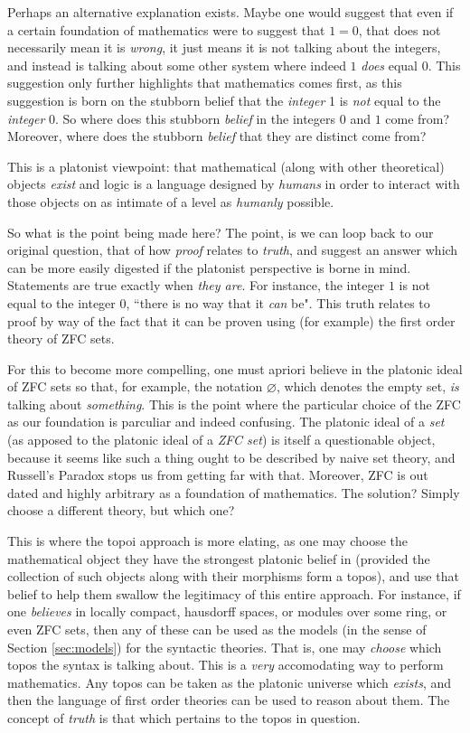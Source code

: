 \documentclass[12pt]{article}
\theoremstyle{plain}
\theoremstyle{definition}
\begin{document}
	Perhaps an alternative explanation exists. Maybe one would suggest that even if a certain foundation of mathematics were to suggest that $1 = 0$, that does not necessarily mean it is \emph{wrong}, it just means it is not talking about the integers, and instead is talking about some other system where indeed $1$ \emph{does} equal $0$. This suggestion only further highlights that mathematics comes first, as this suggestion is born on the stubborn belief that the \emph{integer} 1 is \emph{not} equal to the \emph{integer} 0. So where does this stubborn \emph{belief} in the integers $0$ and $1$ come from? Moreover, where does the stubborn \emph{belief} that they are distinct come from?
	
	This is a platonist viewpoint: that mathematical (along with other theoretical) objects \emph{exist} and logic is a language designed by \emph{humans} in order to interact with those objects on as intimate of a level as \emph{humanly} possible.
	
	So what is the point being made here? The point, is we can loop back to our original question, that of how \emph{proof} relates to \emph{truth}, and suggest an answer which can be more easily digested if the platonist perspective is borne in mind. Statements are true exactly when \emph{they are}. For instance, the integer $1$ is not equal to the integer $0$, ``there is no way that it \emph{can} be". This truth relates to proof by way of the fact that it can be proven using (for example) the first order theory of ZFC sets.
	
	For this to become more compelling, one must apriori believe in the platonic ideal of ZFC sets so that, for example, the notation $\varnothing$, which denotes the empty set, \emph{is} talking about \emph{something}. This is the point where the particular choice of the ZFC as our foundation is parculiar and indeed confusing. The platonic ideal of a \emph{set} (as apposed to the platonic ideal of a \emph{ZFC set}) is itself a questionable object, because it seems like such a thing ought to be described by naive set theory, and Russell's Paradox stops us from getting far with that. Moreover, ZFC is out dated and highly arbitrary as a foundation of mathematics. The solution? Simply choose a different theory, but which one?
	
	This is where the topoi approach is more elating, as one may choose the mathematical object they have the strongest platonic belief in (provided the collection of such objects along with their morphisms form a topos), and use that belief to help them swallow the legitimacy of this entire approach. For instance, if one \emph{believes} in locally compact, hausdorff spaces, or modules over some ring, or even ZFC sets, then any of these can be used as the models (in the sense of Section \ref{sec:models}) for the syntactic theories. That is, one may \emph{choose} which topos the syntax is talking about. This is a \emph{very} accomodating way to perform mathematics. Any topos can be taken as the platonic universe which \emph{exists}, and then the language of first order theories can be used to reason about them. The concept of \emph{truth} is that which pertains to the topos in question.
	
\end{document}
